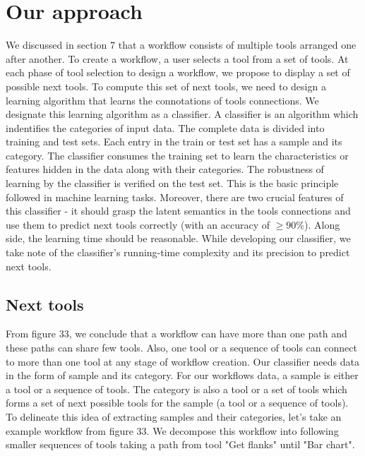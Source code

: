 \chapter{Our approach}\label{chap:approach_wf}
We discussed in section 7 that a workflow consists of multiple tools arranged one after another. To create a workflow, a user selects a tool from a set of tools. At each phase of tool selection to design a workflow, we propose to display a set of possible next tools. To compute this set of next tools, we need to design a learning algorithm that learns the connotations of tools connections. We designate this learning algorithm as a classifier. A classifier is an algorithm which indentifies the categories of input data. The complete data is divided into training and test sets. Each entry in the train or test set has a sample and its category. The classifier consumes the training set to learn the characteristics or features hidden in the data along with their categories. The robustness of learning by the classifier is verified on the test set. This is the basic principle followed in machine learning tasks. Moreover, there are two crucial features of this classifier - it should grasp the latent semantics in the tools connections and use them to predict next tools correctly (with an accuracy of $\geq90\%$). Along side, the learning time should be reasonable. While developing our classifier, we take note of the classifier's running-time complexity and its precision to predict next tools.

\section{Next tools}
From figure 33, we conclude that a workflow can have more than one path and these paths can share few tools. Also, one tool or a sequence of tools can connect to more than one tool at any stage of workflow creation. Our classifier needs data in the form of sample and its category. For our workflows data, a sample is either a tool or a sequence of tools. The category is also a tool or a set of tools which forms a set of next possible tools for the sample (a tool or a sequence of tools). To delineate this idea of extracting samples and their categories, let's take an example workflow from figure 33. We decompose this workflow into following smaller sequences of tools taking a path from tool "Get flanks" until "Bar chart".

